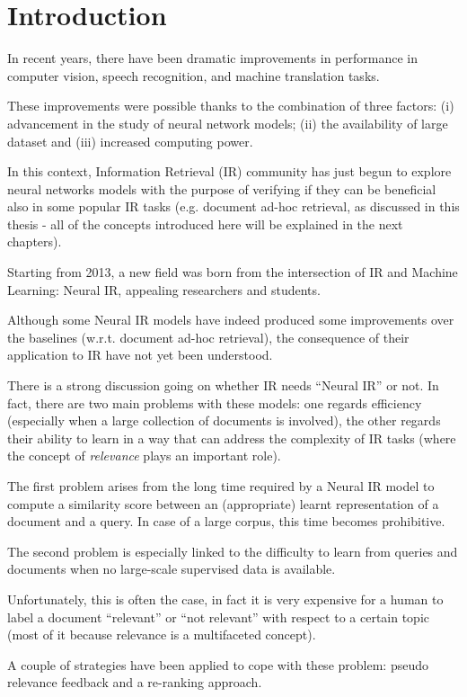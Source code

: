 \newpage
\chapter{Introduction}

In recent years, there have been dramatic improvements in performance in computer vision, speech recognition, and machine translation tasks.

These improvements were possible thanks to the combination of three factors: (i) advancement in the study of neural network models; (ii) the availability of large dataset and (iii) increased computing power.

In this context, Information Retrieval (IR) community has just begun to explore neural networks models with the purpose of verifying if they can be beneficial also in some popular IR tasks (e.g. document ad-hoc retrieval, as discussed in this thesis - all of the concepts introduced here will be explained in the next chapters).

Starting from 2013, a new field was born from the intersection of IR and Machine Learning: Neural IR, appealing researchers and students.

Although some Neural IR models have indeed produced some improvements over the baselines (w.r.t. document ad-hoc retrieval), the consequence of their application to IR have not yet been understood.

There is a strong discussion going on whether IR needs ``Neural IR'' or not. In fact, there are two main problems with these models: one regards efficiency (especially when a large collection of documents is involved), the other regards their ability to learn in a way that can address the complexity of IR tasks (where the concept of \textit{relevance} plays an important role).

The first problem arises from the long time required by a Neural IR model to compute a similarity score between an (appropriate) learnt representation of a document and a query. In case of a large corpus, this time becomes prohibitive.

The second problem is especially linked to the difficulty to learn from queries and documents when no large-scale supervised data is available.

Unfortunately, this is often the case, in fact it is very expensive for a human to label a document ``relevant'' or ``not relevant'' with respect to a certain topic (most of it because relevance is a multifaceted concept).

A couple of strategies have been applied to cope with these problem: pseudo relevance feedback and a re-ranking approach.

